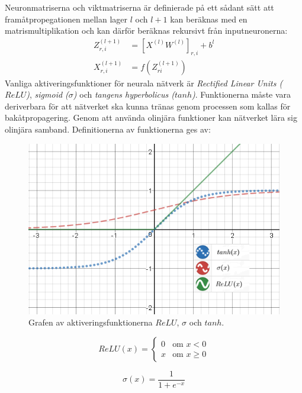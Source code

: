 \documentclass[a4paper,11pt,twoside]{article}
\begin{document}
Neuronmatriserna och viktmatriserna är definierade på ett sådant sätt att framåtpropegationen mellan lager $l$ och $l+1$ kan beräknas med en matrismultiplikation och kan därför beräknas rekursivt från inputneuronerna: \cite{cs231n} \cite{wikiStanford}
\begin{align}\label{feed-forward}
Z_{r,i}^{(l+1)} & = [X^{(l)}W^{(l)}]_{r,i}+b^{l}\\
X_{r,i}^{(l+1)} & = f(Z_{ri}^{(l+1)})
\end{align}
Vanliga aktiveringsfunktioner för neurala nätverk är \textit{Rectified Linear Units ($ReLU$)}, \textit{sigmoid ($\sigma$)} och \textit{tangens hyperbolicus ($tanh$)}. Funktionerna måste vara deriverbara för att nätverket ska kunna tränas genom processen som kallas för bakåtpropagering. Genom att använda olinjära funktioner kan nätverket lära sig olinjära samband. Definitionerna av funktionerna ges av: \cite{cs231n} 
\begin{figure}[h]\label{aktiveringsfunktion}
	\centering
  		\includegraphics[scale=0.83]{activationfunction.png}
  	\caption{Grafen av aktiveringsfunktionerna $ReLU$, $\sigma$ och $tanh$.}
\end{figure}

\begin{equation}
ReLU(x) = \begin{cases} 
			0 & \mbox{om } x < 0 \\ 
			x & \mbox{om } x \geq 0 
		\end{cases}
\end{equation}

\begin{equation}
\sigma(x) = \frac{1}{1+e^{-x}}
\end{equation}
\end{document}
